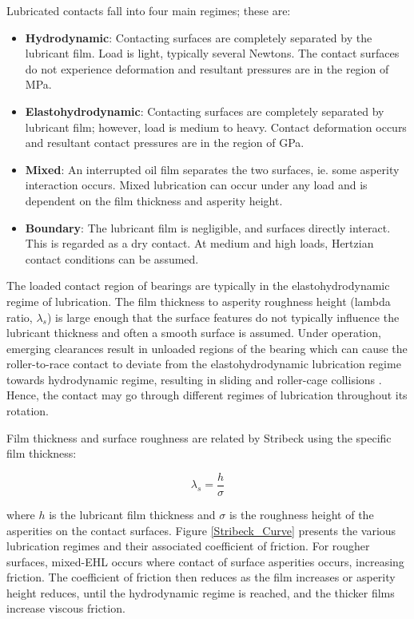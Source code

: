 Lubricated contacts fall into four main regimes; these are:

\begin{itemize}
	\item \textbf{Hydrodynamic}: Contacting surfaces are completely separated by the lubricant film. Load is light, typically several Newtons. The contact surfaces do not experience deformation and resultant pressures are in the region of MPa.
	\item \textbf{Elastohydrodynamic}: Contacting surfaces are completely separated by lubricant film; however, load is medium to heavy. Contact deformation occurs and resultant contact pressures are in the region of GPa.
	\item \textbf{Mixed}: An interrupted oil film separates the two surfaces, ie. some asperity interaction occurs. Mixed lubrication can occur under any load and is dependent on the film thickness and asperity height.
	\item \textbf{Boundary}: The lubricant film is negligible, and surfaces directly interact. This is regarded as a dry contact. At medium and high loads, Hertzian contact conditions can be assumed.
\end{itemize}

The loaded contact region of bearings are typically in the elastohydrodynamic regime of lubrication. The film thickness to asperity roughness height (lambda ratio, $\lambda_s$) is large enough that the surface features do not typically influence the lubricant thickness and often a smooth surface is assumed. Under operation, emerging clearances result in unloaded regions of the bearing which can cause the roller-to-race contact to deviate from the elastohydrodynamic lubrication regime towards hydrodynamic regime, resulting in sliding and roller-cage collisions \cite{Mohammadpour2015c}. Hence, the contact may go through different regimes of lubrication throughout its rotation.

Film thickness and surface roughness are related by Stribeck \cite{Stribeck1907} using the specific film thickness:

\begin{equation}\label{eq2.5}
	\lambda_s=\frac{h}{\sigma}
\end{equation}
 
 where $h$ is the lubricant film thickness and $\sigma$ is the roughness height of the asperities on the contact surfaces. Figure \ref{Stribeck_Curve} presents the various lubrication regimes and their associated coefficient of friction. For rougher surfaces, mixed-EHL occurs where contact of surface asperities occurs, increasing friction. The coefficient of friction then reduces as the film increases or asperity height reduces, until the hydrodynamic regime is reached, and the thicker films increase viscous friction.

